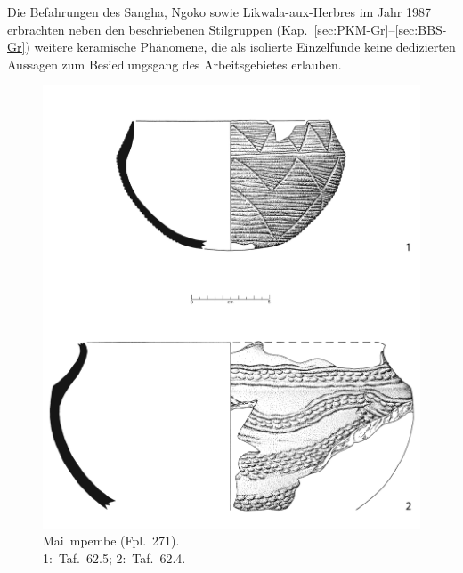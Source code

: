 Die Befahrungen des \mbox{Sangha}, \mbox{Ngoko} sowie Likwala-aux-Herbres im Jahr 1987 erbrachten neben den beschriebenen Stilgruppen (Kap.~\ref{sec:PKM-Gr}--\ref{sec:BBS-Gr}) weitere keramische Phänomene, die als isolierte Einzelfunde keine dedizierten Aussagen zum Besiedlungsgang des Arbeitsgebietes erlauben.

\begin{figure}[p]
	\centering
	\begin{minipage}[b]{\columnwidth}
		\includegraphics[width=\textwidth]{fig/MPB87-101_Typen.pdf}
		\caption{Mai~mpembe (Fpl.~271).\\1:~Taf.~62.5; 2:~Taf.~62.4.}
		\label{fig:MPB87-101}
	\end{minipage}\hfill
	\begin{minipage}[b]{\columnwidth}

\end{minipage}
\end{figure}
